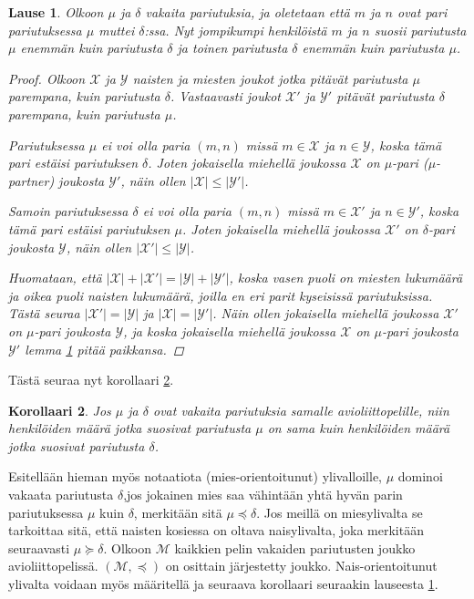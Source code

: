 \documentclass[finnish]{tktltiki2}
\newtheorem{lau}{Lause}
\newtheorem{kor}[lau]{Korollaari}
\theoremstyle{definition}
\theoremstyle{remark}
\begin{document}
\begin{lau} \cite[p. 18]{gusfield1989stable}\label{lause-guspref}
	Olkoon $\mu$ ja $\delta$ vakaita pariutuksia, ja oletetaan että $m$ ja $n$ ovat pari pariutuksessa $\mu$ muttei $\delta$:ssa. Nyt jompikumpi henkilöistä $m$ ja $n$ suosii pariutusta $\mu$ enemmän kuin pariutusta $\delta$ ja toinen pariutusta $\delta$ enemmän kuin pariutusta $\mu$.
\begin{proof} \cite[s. 18]{gusfield1989stable}
Olkoon $\mathcal{X}$ ja $\mathcal{Y}$ naisten ja miesten joukot jotka pitävät pariutusta $\mu$ parempana, kuin pariutusta $\delta$. Vastaavasti joukot $\mathcal{X}'$ ja $\mathcal{Y}'$ pitävät pariutusta $\delta$ parempana, kuin pariutusta $\mu$.

Pariutuksessa $\mu$ ei voi olla paria $(m, n)$ missä $m \in \mathcal{X}$ ja $n \in \mathcal{Y}$, koska tämä pari estäisi pariutuksen $\delta$. Joten jokaisella miehellä joukossa $\mathcal{X}$ on $\mu$-pari (\emph{$\mu$-partner}) joukosta $\mathcal{Y'}$, näin ollen $|\mathcal{X}| \leq |\mathcal{Y'}|$.

Samoin pariutuksessa $\delta$ ei voi olla paria $(m, n)$ missä $m \in \mathcal{X}'$ ja $n \in \mathcal{Y}'$, koska tämä pari estäisi pariutuksen $\mu$. Joten jokaisella miehellä joukossa $\mathcal{X}'$ on $\delta$-pari joukosta $\mathcal{Y}$, näin ollen $|\mathcal{X}'| \leq |\mathcal{Y}|$.

Huomataan, että $|\mathcal{X}| + |\mathcal{X}'| = |\mathcal{Y}| + |\mathcal{Y}'|$, koska vasen puoli on miesten lukumäärä ja oikea puoli naisten lukumäärä, joilla en eri parit kyseisissä pariutuksissa. Tästä seuraa $|\mathcal{X}'| = |\mathcal{Y}|$ ja $|\mathcal{X}| = |\mathcal{Y}'|$. Näin ollen jokaisella miehellä joukossa $\mathcal{X}'$ on $\mu$-pari joukosta $\mathcal{Y}$, ja koska jokaisella miehellä joukossa $\mathcal{X}$ on $\mu$-pari joukosta $\mathcal{Y}'$ lemma \ref{lause-guspref} pitää paikkansa.
\end{proof}
\end{lau}

Tästä seuraa nyt korollaari \ref{eqkor}.

\begin{kor}\cite[s. 18]{gusfield1989stable}\label{eqkor}
Jos $\mu$ ja $\delta$ ovat vakaita pariutuksia samalle avioliittopelille, niin henkilöiden määrä jotka suosivat pariutusta $\mu$ on sama kuin henkilöiden määrä jotka suosivat pariutusta $\delta$.
\end{kor}

Esitellään hieman myös notaatiota (mies-orientoitunut) ylivalloille,  $\mu$ dominoi vakaata pariutusta $\delta$,jos jokainen mies saa vähintään yhtä hyvän parin pariutuksessa $\mu$ kuin $\delta$, merkitään sitä $\mu \preceq \delta$.
Jos meillä on miesylivalta se tarkoittaa sitä, että naisten kosiessa on oltava naisylivalta, joka merkitään seuraavasti $\mu \succeq \delta$. Olkoon $\mathcal{M}$ kaikkien pelin vakaiden pariutusten joukko avioliittopelissä. $(\mathcal{M}, \preceq)$ on osittain järjestetty joukko.
Nais-orientoitunut ylivalta voidaan myös määritellä ja seuraava korollaari seuraakin lauseesta \ref{lause-guspref}.
\end{document}
